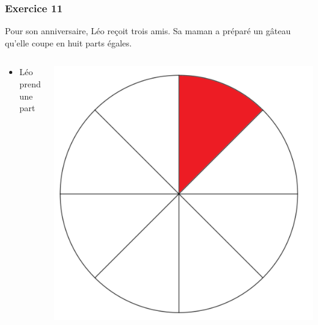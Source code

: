 \documentclass[xcolor={dvipsnames}]{beamer}
\begin{document}
\begin{frame}
	\frametitle{Exercice 11}
	
	Pour son anniversaire, Léo reçoit trois amis. Sa maman a préparé un gâteau qu'elle coupe en huit parts égales.
	
	
	\begin{columns}
		\begin{column}{0.5\textwidth}
			\begin{itemize}
				\item Léo prend une part
			\end{itemize}
		\end{column}
	\begin{column}{0.5\textwidth}
		\begin{center}
			\includegraphics[scale=0.08]{11_2}
		\end{center}
	\end{column}
	\end{columns}
	
\end{frame}
\end{document}
